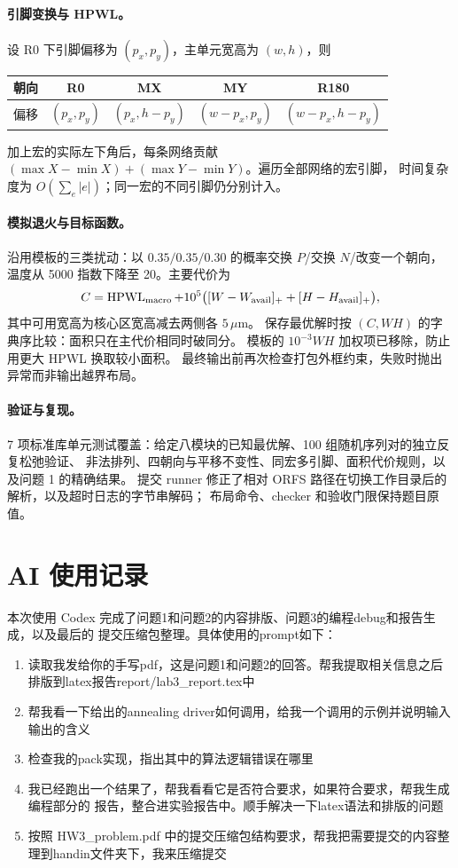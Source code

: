\documentclass[UTF8,a4paper,11pt,fontset=fandol]{ctexart}
\begin{document}
\paragraph{引脚变换与 HPWL。}
设 R0 下引脚偏移为 $(p_x,p_y)$，主单元宽高为 $(w,h)$，则
\begin{center}
\begin{tabular}{ccccc}
\toprule
朝向 & R0 & MX & MY & R180 \\\midrule
偏移 & $(p_x,p_y)$ & $(p_x,h-p_y)$ & $(w-p_x,p_y)$ & $(w-p_x,h-p_y)$ \\\bottomrule
\end{tabular}
\end{center}
加上宏的实际左下角后，每条网络贡献
$(\max X-\min X)+(\max Y-\min Y)$。遍历全部网络的宏引脚，
时间复杂度为 $O(\sum_e |e|)$；同一宏的不同引脚仍分别计入。

\paragraph{模拟退火与目标函数。}
沿用模板的三类扰动：以 $0.35/0.35/0.30$ 的概率交换 $P$/交换 $N$/改变一个朝向，
温度从 5000 指数下降至 20。主要代价为
\[
C=\operatorname{HPWL}_{\rm macro}
 +10^5\bigl([W-W_{\rm avail}]_+ +[H-H_{\rm avail}]_+\bigr),
\]
其中可用宽高为核心区宽高减去两侧各 $5\,\mu$m。
保存最优解时按 $(C,WH)$ 的字典序比较：面积只在主代价相同时破同分。
模板的 $10^{-3}WH$ 加权项已移除，防止用更大 HPWL 换取较小面积。
最终输出前再次检查打包外框约束，失败时抛出异常而非输出越界布局。

\paragraph{验证与复现。}
7 项标准库单元测试覆盖：给定八模块的已知最优解、100 组随机序列对的独立反复松弛验证、
非法排列、四朝向与平移不变性、同宏多引脚、面积代价规则，以及问题 1 的精确结果。
提交 runner 修正了相对 ORFS 路径在切换工作目录后的解析，以及超时日志的字节串解码；
布局命令、checker 和验收门限保持题目原值。

\clearpage


\clearpage
\appendix
\section{AI 使用记录}
本次使用 Codex 完成了问题1和问题2的内容排版、问题3的编程debug和报告生成，以及最后的
提交压缩包整理。具体使用的prompt如下：
\begin{enumerate}
  \item 读取我发给你的手写pdf，这是问题1和问题2的回答。帮我提取相关信息之后排版到latex报告report/lab3_report.tex中
  \item 帮我看一下给出的annealing driver如何调用，给我一个调用的示例并说明输入输出的含义
  \item 检查我的pack实现，指出其中的算法逻辑错误在哪里
  \item 我已经跑出一个结果了，帮我看看它是否符合要求，如果符合要求，帮我生成编程部分的
  报告，整合进实验报告中。顺手解决一下latex语法和排版的问题
  \item 按照 HW3_problem.pdf 中的提交压缩包结构要求，帮我把需要提交的内容整理到handin文件夹下，我来压缩提交
\end{enumerate}
\end{document}
